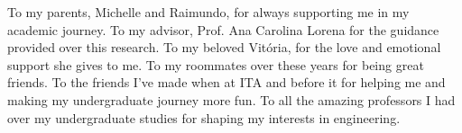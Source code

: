 To my parents, Michelle and Raimundo, for always supporting me in my academic journey. To my advisor, Prof. Ana Carolina Lorena for the guidance provided over this research. To my beloved Vitória, for the love and emotional support she gives to me. To my roommates over these years for being great friends. To the friends I've made when at ITA and before it for helping me and making my undergraduate journey more fun. To all the amazing professors I had over my undergraduate studies for shaping my interests in engineering.
